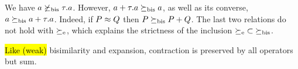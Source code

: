 
\begin{example}
\label{exa:contr}
We have %
 $ a \not  \mathrel{\succeq_{\rm{bis}}} \tau. a$. However,
$a+ \tau . a \mathrel{\succeq_{\rm{bis}}} a$, as well as its converse, 
$  a \mathrel{\succeq_{\rm{bis}}} a +
\tau . a $. Indeed, if $P \approx Q$ then 
$  P  \mathrel{\succeq_{\rm{bis}}} P +Q$. The last two relations do not hold with 
$\mathrel{\succeq_{\rm{e}}}$, which explains the strictness of the inclusion
 ${\mathrel{\succeq_{\rm{e}}}} \subset {\mathrel{\succeq_{\rm{bis}}}}$. 
\end{example} 


\hl{Like (weak)} bisimilarity and expansion, contraction is preserved by all operators but sum.
